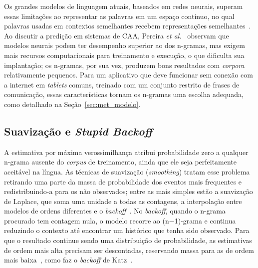 Os grandes modelos de linguagem atuais, baseados em redes neurais, superam essas limitações ao representar as palavras em um espaço contínuo, no qual palavras usadas em contextos semelhantes recebem representações semelhantes~\cite[cap.~3]{jurafsky2026slp}. Ao discutir a predição em sistemas de \gls{CAA}, Pereira \textit{et al.}~\cite{pereira2024predictive} observam que modelos neurais podem ter desempenho superior ao dos n-gramas, mas exigem mais recursos computacionais para treinamento e execução, o que dificulta sua implantação; os n-gramas, por sua vez, produzem bons resultados com \textit{corpora} relativamente pequenos. Para um aplicativo que deve funcionar sem conexão com a internet em \textit{tablets} comuns, treinado com um conjunto restrito de frases de comunicação, essas características tornam os n-gramas uma escolha adequada, como detalhado na Seção~\ref{sec:met_modelo}.

\subsection{Suavização e \textit{Stupid Backoff}} \label{sec:suavizacao}

A estimativa por máxima verossimilhança atribui probabilidade zero a qualquer n-grama ausente do \textit{corpus} de treinamento, ainda que ele seja perfeitamente aceitável na língua. As técnicas de suavização (\textit{smoothing}) tratam esse problema retirando uma parte da massa de probabilidade dos eventos mais frequentes e redistribuindo-a para os não observados; entre as mais simples estão a suavização de Laplace, que soma uma unidade a todas as contagens, a interpolação entre modelos de ordens diferentes e o \textit{backoff}~\cite[cap.~3]{jurafsky2026slp}. No \textit{backoff}, quando o n-grama procurado tem contagem nula, o modelo recorre ao (n$-$1)-grama e continua reduzindo o contexto até encontrar um histórico que tenha sido observado. Para que o resultado continue sendo uma distribuição de probabilidade, as estimativas de ordem mais alta precisam ser descontadas, reservando massa para as de ordem mais baixa~\cite[cap.~3]{jurafsky2026slp}, como faz o \textit{backoff} de Katz~\cite{katz1987estimation}.


